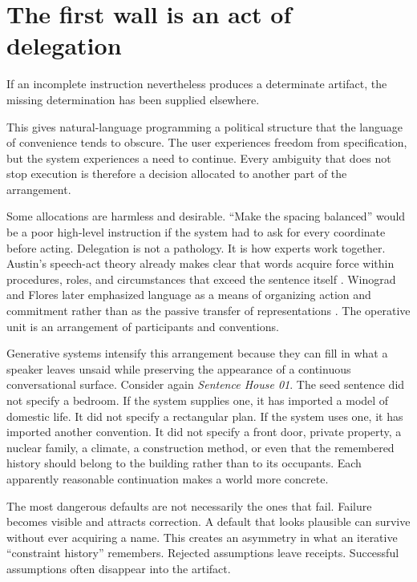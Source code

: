 \documentclass[11pt]{article}
\begin{document}
\section{The first wall is an act of delegation}

If an incomplete instruction nevertheless produces a determinate artifact, the missing determination has been supplied elsewhere.

This gives natural-language programming a political structure that the language of convenience tends to obscure. The user experiences freedom from specification, but the system experiences a need to continue. Every ambiguity that does not stop execution is therefore a decision allocated to another part of the arrangement.

Some allocations are harmless and desirable. ``Make the spacing balanced'' would be a poor high-level instruction if the system had to ask for every coordinate before acting. Delegation is not a pathology. It is how experts work together. Austin's speech-act theory already makes clear that words acquire force within procedures, roles, and circumstances that exceed the sentence itself \citep{austin1962things}. Winograd and Flores later emphasized language as a means of organizing action and commitment rather than as the passive transfer of representations \citep{winogradflores1986understanding}. The operative unit is an arrangement of participants and conventions.

Generative systems intensify this arrangement because they can fill in what a speaker leaves unsaid while preserving the appearance of a continuous conversational surface. Consider again \emph{Sentence House 01}. The seed sentence did not specify a bedroom. If the system supplies one, it has imported a model of domestic life. It did not specify a rectangular plan. If the system uses one, it has imported another convention. It did not specify a front door, private property, a nuclear family, a climate, a construction method, or even that the remembered history should belong to the building rather than to its occupants. Each apparently reasonable continuation makes a world more concrete.

The most dangerous defaults are not necessarily the ones that fail. Failure becomes visible and attracts correction. A default that looks plausible can survive without ever acquiring a name. This creates an asymmetry in what an iterative ``constraint history'' remembers. Rejected assumptions leave receipts. Successful assumptions often disappear into the artifact.
\end{document}
